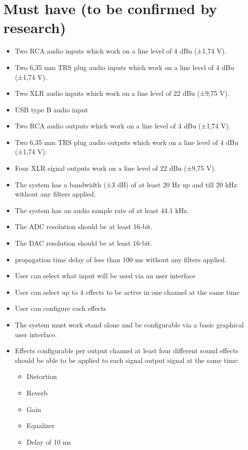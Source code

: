 	\section{Must have (to be confirmed by research)}
	
\begin{itemize}
	\setlength\itemsep{-0.2em}
	\item Two RCA audio inputs which work on a line level of 4 dBu (±1,74 V).
	\item Two 6,35 mm TRS plug audio inputs which work on a line level of 4 dBu (±1,74 V).
	\item Two XLR audio inputs which work on a line level of 22 dBu (±9,75 V).
	\item USB type B audio input
	\item Two RCA audio outputs which work on a line level of 4 dBu (±1,74 V).
	\item Two 6,35 mm TRS plug audio outputs which work on a line level of 4 dBu (±1,74 V).
	\item Four XLR signal outputs work on a line level of 22 dBu (±9,75 V).
	\item The system has a bandwidth (±3 dB) of at least 20 Hz up and till 20 kHz without any filters applied.
	\item The system has an audio sample rate of at least 44.1 kHz.
	\item The ADC resolution should be at least 16-bit.
	\item The DAC resolution should be at least 16-bit.
	\item propagation time delay of less than 100 ms without any filters applied.
	\item User can select what input will be used via an user interface
	\item User can select up to 4 effects to be active in one channel at the same time
	\item User can configure each effects
	\item The system must work stand alone and be configurable via a basic graphical user interface.
	\item Effects configurable per output channel at least four different sound effects should be able to be applied to each signal output signal at the same time:
	\begin{itemize} %
		\setlength\itemsep{-0.2em}
		\item Distortion
		\item Reverb
		\item Gain
		\item Equalizer 
		\item Delay of 10 ms
	\end{itemize}
\end{itemize}
	

